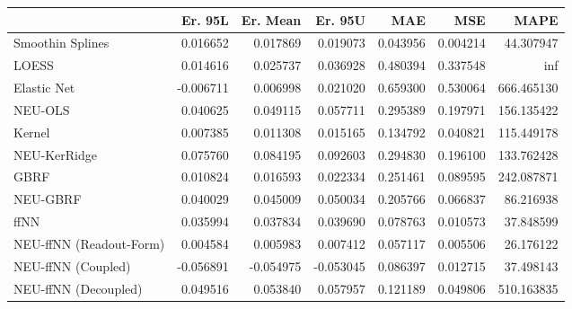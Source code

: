 \begin{tabular}{lrrrrrr}
\toprule
{} &   Er. 95L &  Er. Mean &   Er. 95U &       MAE &       MSE &        MAPE \\
\midrule
Smoothin Splines        &  0.016652 &  0.017869 &  0.019073 &  0.043956 &  0.004214 &   44.307947 \\
LOESS                   &  0.014616 &  0.025737 &  0.036928 &  0.480394 &  0.337548 &         inf \\
Elastic Net             & -0.006711 &  0.006998 &  0.021020 &  0.659300 &  0.530064 &  666.465130 \\
NEU-OLS                 &  0.040625 &  0.049115 &  0.057711 &  0.295389 &  0.197971 &  156.135422 \\
Kernel                  &  0.007385 &  0.011308 &  0.015165 &  0.134792 &  0.040821 &  115.449178 \\
NEU-KerRidge            &  0.075760 &  0.084195 &  0.092603 &  0.294830 &  0.196100 &  133.762428 \\
GBRF                    &  0.010824 &  0.016593 &  0.022334 &  0.251461 &  0.089595 &  242.087871 \\
NEU-GBRF                &  0.040029 &  0.045009 &  0.050034 &  0.205766 &  0.066837 &   86.216938 \\
ffNN                    &  0.035994 &  0.037834 &  0.039690 &  0.078763 &  0.010573 &   37.848599 \\
NEU-ffNN (Readout-Form) &  0.004584 &  0.005983 &  0.007412 &  0.057117 &  0.005506 &   26.176122 \\
NEU-ffNN (Coupled)      & -0.056891 & -0.054975 & -0.053045 &  0.086397 &  0.012715 &   37.498143 \\
NEU-ffNN (Decoupled)    &  0.049516 &  0.053840 &  0.057957 &  0.121189 &  0.049806 &  510.163835 \\
\bottomrule
\end{tabular}
